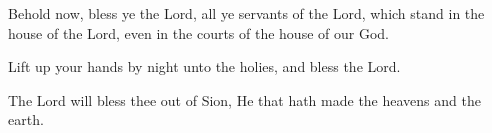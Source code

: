 Behold now, bless ye the Lord, all ye servants of the Lord, which stand in the house of the Lord, even in the courts of the house of our God.

Lift up your hands by night unto the holies, and bless the Lord.

The Lord will bless thee out of Sion, He that hath made the heavens and the earth.
